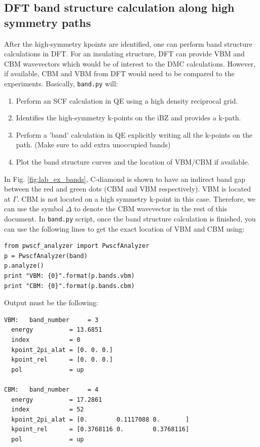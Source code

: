 \subsection{DFT band structure calculation along high symmetry paths}
After the high-symmetry kpoints are identified, one can perform band structure calculations in DFT. 
For an insulating structure, DFT can provide VBM and CBM wavevectors which would be of interest to the DMC calculations. 
However, if available, CBM and VBM from DFT would need to be compared to the experiments.  
Basically,  \texttt{band.py} will:
\begin{enumerate}
	\item Perform an SCF calculation in QE using a high density reciprocal grid.
	\item Identifies the high-symmetry k-points on the iBZ and provides a k-path.
	\item Perform a 'band' calculation in QE explicitly writing all the k-points on the path. (Make sure to add extra unoccupied bands)
	\item Plot the band structure curves and the location of VBM/CBM if available.
\end{enumerate}
In Fig. \ref{fig:lab_ex_bands}, C-diamond is shown to have an indirect band gap between the red and green dots (CBM and VBM respectively). 
VBM is located at $\Gamma$. CBM is not located on a high symmetry k-point in this case. 
Therefore, we can use the symbol $\Delta$ to denote the CBM wavevector in the rest of this document. 
In \texttt{band.py} script, once the band structure calculation is finished, you can use the following lines to get the exact location of VBM and CBM using:
\begin{lstlisting}
from pwscf_analyzer import PwscfAnalyzer
p = PwscfAnalyzer(band)
p.analyze()
print "VBM: {0}".format(p.bands.vbm)
print "CBM: {0}".format(p.bands.cbm)
\end{lstlisting}
Output must be the following:
\begin{lstlisting}
VBM:   band_number     = 3
  energy          = 13.6851
  index           = 0
  kpoint_2pi_alat = [0. 0. 0.]
  kpoint_rel      = [0. 0. 0.]
  pol             = up

CBM:   band_number     = 4
  energy          = 17.2861
  index           = 52
  kpoint_2pi_alat = [0.        0.1117088 0.       ]
  kpoint_rel      = [0.3768116 0.        0.3768116]
  pol             = up
\end{lstlisting}
